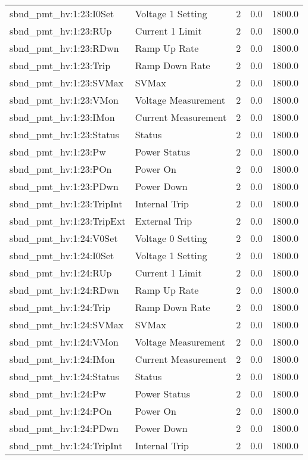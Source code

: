 \begin{center}
\begin{longtable}{l | l l l l }
sbnd\_pmt\_hv:1:23:I0Set & Voltage 1 Setting & 2 & 0.0 & 1800.0\\ 
sbnd\_pmt\_hv:1:23:RUp & Current 1 Limit & 2 & 0.0 & 1800.0\\ 
sbnd\_pmt\_hv:1:23:RDwn & Ramp Up Rate & 2 & 0.0 & 1800.0\\ 
sbnd\_pmt\_hv:1:23:Trip & Ramp Down Rate & 2 & 0.0 & 1800.0\\ 
sbnd\_pmt\_hv:1:23:SVMax & SVMax & 2 & 0.0 & 1800.0\\ 
sbnd\_pmt\_hv:1:23:VMon & Voltage Measurement & 2 & 0.0 & 1800.0\\ 
sbnd\_pmt\_hv:1:23:IMon & Current Measurement & 2 & 0.0 & 1800.0\\ 
sbnd\_pmt\_hv:1:23:Status & Status & 2 & 0.0 & 1800.0\\ 
sbnd\_pmt\_hv:1:23:Pw & Power Status & 2 & 0.0 & 1800.0\\ 
sbnd\_pmt\_hv:1:23:POn & Power On & 2 & 0.0 & 1800.0\\ 
sbnd\_pmt\_hv:1:23:PDwn & Power Down & 2 & 0.0 & 1800.0\\ 
sbnd\_pmt\_hv:1:23:TripInt & Internal Trip & 2 & 0.0 & 1800.0\\ 
sbnd\_pmt\_hv:1:23:TripExt & External Trip & 2 & 0.0 & 1800.0\\ 
sbnd\_pmt\_hv:1:24:V0Set & Voltage 0 Setting & 2 & 0.0 & 1800.0\\ 
sbnd\_pmt\_hv:1:24:I0Set & Voltage 1 Setting & 2 & 0.0 & 1800.0\\ 
sbnd\_pmt\_hv:1:24:RUp & Current 1 Limit & 2 & 0.0 & 1800.0\\ 
sbnd\_pmt\_hv:1:24:RDwn & Ramp Up Rate & 2 & 0.0 & 1800.0\\ 
sbnd\_pmt\_hv:1:24:Trip & Ramp Down Rate & 2 & 0.0 & 1800.0\\ 
sbnd\_pmt\_hv:1:24:SVMax & SVMax & 2 & 0.0 & 1800.0\\ 
sbnd\_pmt\_hv:1:24:VMon & Voltage Measurement & 2 & 0.0 & 1800.0\\ 
sbnd\_pmt\_hv:1:24:IMon & Current Measurement & 2 & 0.0 & 1800.0\\ 
sbnd\_pmt\_hv:1:24:Status & Status & 2 & 0.0 & 1800.0\\ 
sbnd\_pmt\_hv:1:24:Pw & Power Status & 2 & 0.0 & 1800.0\\ 
sbnd\_pmt\_hv:1:24:POn & Power On & 2 & 0.0 & 1800.0\\ 
sbnd\_pmt\_hv:1:24:PDwn & Power Down & 2 & 0.0 & 1800.0\\ 
sbnd\_pmt\_hv:1:24:TripInt & Internal Trip & 2 & 0.0 & 1800.0\\ 

\end{longtable}
\end{center}
